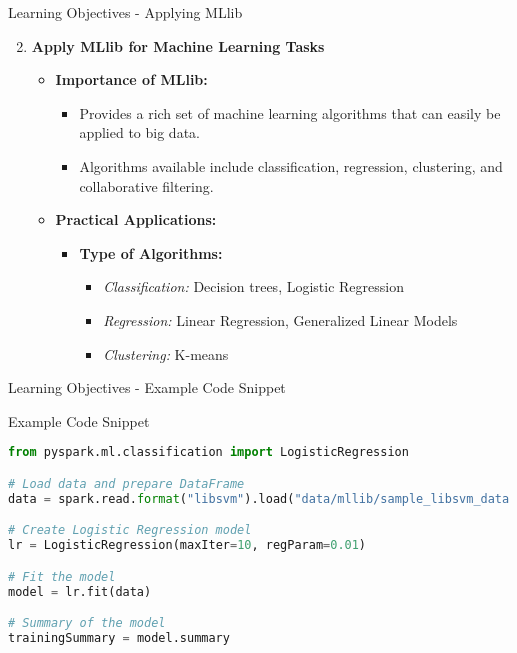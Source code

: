 \documentclass[aspectratio=169]{beamer}
\begin{document}
\begin{frame}[fragile]{Learning Objectives - Applying MLlib}
  \begin{enumerate}\setcounter{enumi}{1}
    \item \textbf{Apply MLlib for Machine Learning Tasks}
    \begin{itemize}
      \item \textbf{Importance of MLlib:}
        \begin{itemize}
          \item Provides a rich set of machine learning algorithms that can easily be applied to big data.
          \item Algorithms available include classification, regression, clustering, and collaborative filtering.
        \end{itemize}
        
      \item \textbf{Practical Applications:}
        \begin{itemize}
          \item \textbf{Type of Algorithms:}
            \begin{itemize}
              \item \textit{Classification:} Decision trees, Logistic Regression
              \item \textit{Regression:} Linear Regression, Generalized Linear Models
              \item \textit{Clustering:} K-means
            \end{itemize}
        \end{itemize}
      \end{itemize}
  \end{enumerate}
\end{frame}

\begin{frame}[fragile]{Learning Objectives - Example Code Snippet}
  \begin{block}{Example Code Snippet}
    \begin{lstlisting}[language=Python]
from pyspark.ml.classification import LogisticRegression

# Load data and prepare DataFrame
data = spark.read.format("libsvm").load("data/mllib/sample_libsvm_data.txt")

# Create Logistic Regression model
lr = LogisticRegression(maxIter=10, regParam=0.01)

# Fit the model
model = lr.fit(data)

# Summary of the model
trainingSummary = model.summary
    \end{lstlisting}
  \end{block}
\end{frame}
\end{document}
